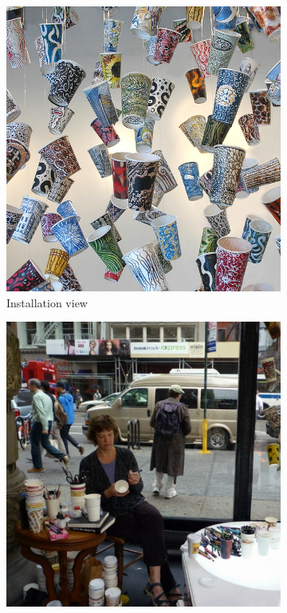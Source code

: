 
\begin{figure}[h!]
\centering
\begin{subfigure}{.47\textwidth}
  \centering
  \includegraphics[width=\linewidth]{graphics/Gwyneth-Leech-cup5.jpg}
  \caption{Installation view}
  \label{fig:GwynethLeech_Installation}
\end{subfigure}
\hfill
\begin{subfigure}{.47\textwidth}
  \centering
  \includegraphics[width=\linewidth]{graphics/Gwyneth-Leech-cup3.jpg}

\end{subfigure}
\end{figure}
